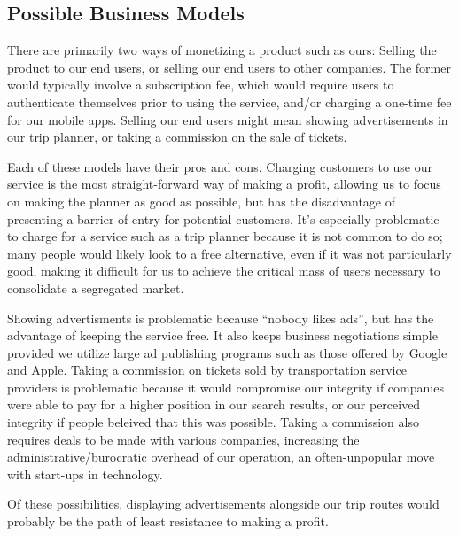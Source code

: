 \subsection{Possible Business Models}

There are primarily two ways of monetizing a product such as ours: Selling the
product to our end users, or selling our end users to other companies. The
former would typically involve a subscription fee, which would require users
to authenticate themselves prior to using the service, and/or charging a
one-time fee for our mobile apps. Selling our end users might mean showing
advertisements in our trip planner, or taking a commission on the sale of
tickets.

Each of these models have their pros and cons. Charging customers to use our
service is the most straight-forward way of making a profit, allowing us to
focus on making the planner as good as possible, but has the disadvantage
of presenting a barrier of entry for potential customers. It's especially
problematic to charge for a service such as a trip planner because it is
not common to do so; many people would likely look to a free alternative,
even if it was not particularly good, making it difficult for us to achieve
the critical mass of users necessary to consolidate a segregated market.

Showing advertisments is problematic because ``nobody likes ads'', but has the
advantage of keeping the service free. It also keeps business negotiations
simple provided we utilize large ad publishing programs such as those offered
by Google and Apple. Taking a commission on tickets sold by transportation
service providers is problematic because it would compromise our integrity if
companies were able to pay for a higher position in our search results, or
our perceived integrity if people beleived that this was possible. Taking a
commission also requires deals to be made with various companies, increasing
the administrative/burocratic overhead of our operation, an often-unpopular
move with start-ups in technology.

Of these possibilities, displaying advertisements alongside our trip routes
would probably be the path of least resistance to making a profit.
